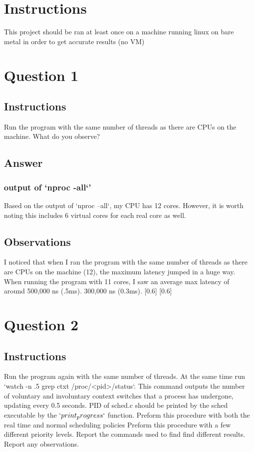 \documentclass{assignment-x}
\begin{document}
\maketitle
\pagebreak

\section{Instructions}
This project should be ran at least once on a machine running linux on bare metal in order to get accurate results (no VM)

\section{Question 1}
\subsection{Instructions}
Run the program with the same number of threads as there are CPUs on the machine. What do you observe?
\subsection{Answer}
\subsubsection{output of `nproc -all`'}
Based on the output of `nproc --all`, my CPU has 12 cores. However, it is worth noting this includes 6 virtual cores for each real core as well.
\subsection{Observations}
I noticed that when I ran the program with the same number of threads as there are CPUs on the machine (12), the maximum latency jumped in a huge way. When running the program with 11 cores, I saw an average max latency of around 500,000 ns (.5ms).  300,000 ns (0.3ms). 
[0.6\linewidth]
[0.6\linewidth]

\section {Question 2}
\subsection{Instructions}
Run the program again with the same number of threads. 
At the same time run `watch -n .5 grep ctxt /proc/<pid>/status`. This command outputs the number of voluntary and involuntary context switches that a process has undergone, updating every 0.5 seconds. 
PID of sched.c should be printed by the sched executable by the $`print_progress`$ function.
Preform this procedure with both the real time and normal scheduling policies
Preform this procedure with a few different priority levels.
Report the commands used to find find different results.
Report any observations.
\end{document}
